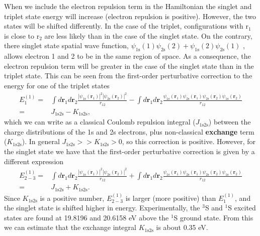 \documentclass[../Main/chem331-notes.tex]{subfiles}
\begin{document}
When we include the electron repulsion term in the Hamiltonian the singlet and triplet state energy will increase (electron repulsion is positive).
However, the two states will be shifted differently.
In the case of the triplet, configurations with $\mathrm{r}_1$ is close to $\mathrm{r}_2$ are less likely than in the case of the singlet state.
On the contrary, there singlet state spatial wave function, $\psi_\mathrm{1s}(1)
\psi_\mathrm{2s}(2)
+
\psi_\mathrm{1s}(2)
\psi_\mathrm{2s}(1)$
, allows electron 1 and 2 to be in the same region of space.
As a consequence, the electron repulsion term will be greater in the case of the singlet state than in the triplet state.
This can be seen from the first-order perturbative correction to the energy for one of the triplet states
\begin{equation}
\begin{split}
E_1^{(1)} = &
\int d\mathbf{r}_1 d\mathbf{r}_2 
\frac{|\psi_\mathrm{1s}(\mathbf{r}_1)|^2 |\psi_\mathrm{2s}(\mathbf{r}_2)|^2}{r_{12}}-
\int d\mathbf{r}_1 d\mathbf{r}_2 
\frac{\psi_\mathrm{1s}(\mathbf{r}_1)\psi_\mathrm{2s}(\mathbf{r}_1) \psi_\mathrm{2s}(\mathbf{r}_2)\psi_\mathrm{1s}(\mathbf{r}_2)}{r_{12}} \\
= & J_\mathrm{1s2s} - K_\mathrm{1s2s},
\end{split}
\end{equation}
which we can write as a classical Coulomb repulsion integral ($J_\mathrm{1s2s}$) between the charge distributions of the 1s and 2s electrons, plus non-classical \textbf{exchange} term ($K_\mathrm{1s2s}$).
In general $J_\mathrm{1s2s} >> K_\mathrm{1s2s} > 0$, so this correction is positive.
However, for the singlet state we have that the first-order perturbative correction is given by a different expression
\begin{equation}
\begin{split}
E_{2-3}^{(1)} = &
\int d\mathbf{r}_1 d\mathbf{r}_2 
\frac{|\psi_\mathrm{1s}(\mathbf{r}_1)|^2 |\psi_\mathrm{2s}(\mathbf{r}_2)|^2}{r_{12}}+
\int d\mathbf{r}_1 d\mathbf{r}_2 
\frac{\psi_\mathrm{1s}(\mathbf{r}_1)\psi_\mathrm{2s}(\mathbf{r}_1) \psi_\mathrm{2s}(\mathbf{r}_2)\psi_\mathrm{1s}(\mathbf{r}_2)}{r_{12}} \\
= & J_\mathrm{1s2s} +  K_\mathrm{1s2s}.
\end{split}
\end{equation}
Since $K_\mathrm{1s2s}$ is a positive number, $E_{2-3}^{(1)}$ is larger (more positive) than $E_1^{(1)}$, and the singlet state is shifted higher in energy.
Experimentally, the $^3$S and $^1$S excited states are found at 19.8196 and 20.6158 eV above the $^1$S ground state.
From this we can estimate that the exchange integral $K_\mathrm{1s2s}$ is about 0.35 eV.


\end{document}
